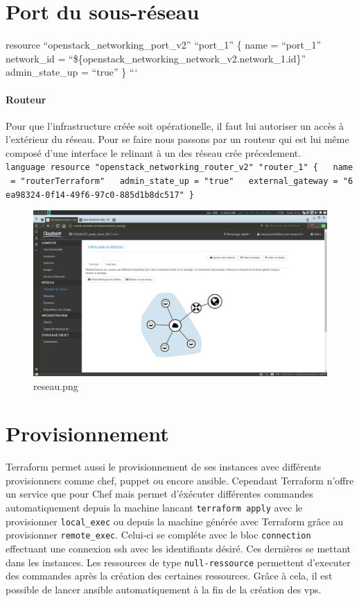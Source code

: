 \documentclass[]{article}
\let\oldparagraph\paragraph
\renewcommand{\paragraph}[1]{\oldparagraph{#1}\mbox{}}
\begin{document}
\section{Port du sous-réseau}\label{port-du-sous-ruxe9seau}

resource ``openstack\_networking\_port\_v2'' ``port\_1'' \{ name =
``port\_1'' network\_id =
``\$\{openstack\_networking\_network\_v2.network\_1.id\}''
admin\_state\_up = ``true'' \} ```

\paragraph{Routeur}\label{routeur}

Pour que l'infrastructure créée soit opérationelle, il faut lui
autoriser un accès à l'extérieur du réseau. Pour se faire nous passons
par un routeur qui est lui même composé d'une interface le relinant à un
des réseau crée précedement.
\texttt{language\ resource\ "openstack\_networking\_router\_v2"\ "router\_1"\ \{\ \ \ name\ =\ "routerTerraform"\ \ \ admin\_state\_up\ =\ "true"\ \ \ external\_gateway\ =\ "6ea98324-0f14-49f6-97c0-885d1b8dc517"\ \}}

\begin{figure}
\centering
\includegraphics{./reseau.png}
\caption{reseau.png}
\end{figure}

\section{Provisionnement}\label{provisionnement}

Terraform permet aussi le provisionnement de ses instances avec
différents provisionners comme chef, puppet ou encore ansible. Cependant
Terraform n'offre un service que pour Chef mais permet d'éxécuter
différentes commandes automatiquement depuis la machine lancant
\texttt{terraform\ apply} avec le provisionner \texttt{local\_exec} ou
depuis la machine générée avec Terraform grâce au provisionner
\texttt{remote\_exec}. Celui-ci se compléte avec le bloc
\texttt{connection} effectuant une connexion ssh avec les identifiants
désiré. Ces dernières se mettant dans les instances. Les ressources de
type \texttt{null-ressource} permettent d'executer des commandes après
la création des certaines ressources. Grâce à cela, il est possible de
lancer ansible automatiquement à la fin de la création des vps.
\end{document}
